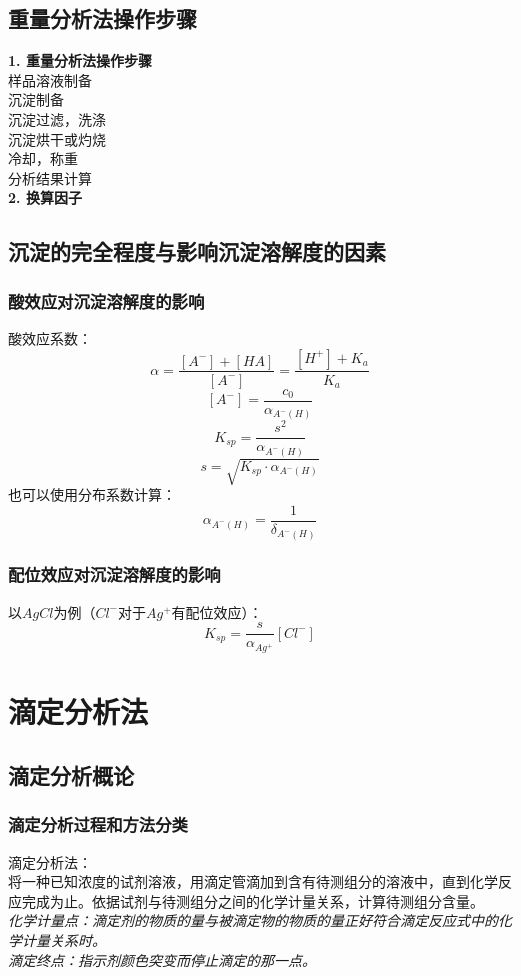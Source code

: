 \documentclass[utf8,a4paper,12pt]{ctexart}
\begin{document}
\subsection{重量分析法操作步骤}
{\bf 1. 重量分析法操作步骤}\\
样品溶液制备\\
沉淀制备\\
沉淀过滤，洗涤\\
沉淀烘干或灼烧\\
冷却，称重\\
分析结果计算\\
{\bf 2. 换算因子}\\

\subsection{沉淀的完全程度与影响沉淀溶解度的因素}
\subsubsection{酸效应对沉淀溶解度的影响}
酸效应系数：
\[\alpha = \frac{[A^-] + [HA]}{[A^-]} = \frac{[H^+] + K_a}{K_a}\]
\[[A^-] = \frac{c_0}{\alpha_{A^-(H)}}\]
\[K_{sp} = \frac{s^2}{\alpha_{A^-(H)}}\]
\[s = \sqrt{K_{sp}\cdot\alpha_{A^-(H)}}\]
也可以使用分布系数计算：
\[\alpha_{A^-(H)} = \frac{1}{\delta_{A^-(H)}}\]
\subsubsection{配位效应对沉淀溶解度的影响}
以$AgCl$为例（$Cl^-$对于$Ag^+$有配位效应）：
\[K_{sp} = \frac{s}{\alpha_{Ag^+}}[Cl^-]\]

\newpage
\section{滴定分析法}
\subsection{滴定分析概论}
\subsubsection{滴定分析过程和方法分类}
滴定分析法：\\
将一种已知浓度的试剂溶液，用滴定管滴加到含有待测组分的溶液中，直到化学反应完成为止。依据试剂与待测组分之间的化学计量关系，计算待测组分含量。\\
\emph{化学计量点：滴定剂的物质的量与被滴定物的物质的量正好符合滴定反应式中的化学计量关系时。\\
滴定终点：指示剂颜色突变而停止滴定的那一点。
}
\end{document}
